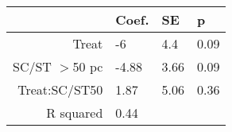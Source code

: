 \begin{tabular}{rlll}
  \hline
 & Coef. & SE & p \\ 
  \hline
Treat & -6 & 4.4 & 0.09 \\ 
  SC/ST $>$50 pc & -4.88 & 3.66 & 0.09 \\ 
  Treat:SC/ST50 & 1.87 & 5.06 & 0.36 \\ 
  R squared & 0.44 &  &  \\ 
   \hline
\end{tabular}

